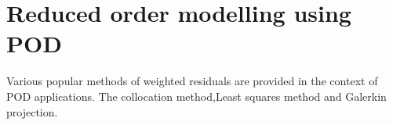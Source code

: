 \documentclass[10pt,a4paper,twoside]{article}
\begin{document}
\section{Reduced order modelling using POD}
Various popular methods of weighted residuals are provided in the context of POD applications.
The collocation method,Least squares method and Galerkin projection.







\end{document}
